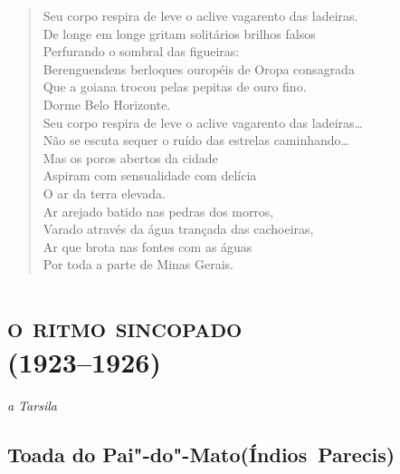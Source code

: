 \begin{verse}
Seu corpo respira de leve o aclive vagarento das ladeiras.\\
De longe em longe gritam solitários brilhos falsos\\
Perfurando o sombral das figueiras:\\
Berenguendens berloques ouropéis de Oropa consagrada\\
Que a goiana trocou pelas pepitas de ouro fino.\\
Dorme Belo Horizonte.\\
Seu corpo respira de leve o aclive vagarento das ladeiras\ldots{}\\
Não se escuta sequer o ruído das estrelas caminhando\ldots{}\\
Mas os poros abertos da cidade\\
Aspiram com sensualidade com delícia\\
O ar da terra elevada.\\
Ar arejado batido nas pedras dos morros,\\
Varado através da água trançada das cachoeiras,\\
Ar que brota nas fontes com as águas\\
Por toda a parte de Minas Gerais.
\end{verse}

\chapter[\textsc{o ritmo sincopado}\\Toada do Pai"-do"-Mato]{\textsc{o ritmo sincopado}\\(1923--1926)}


\begin{flushright}
\emph{a Tarsila}
\end{flushright}

\section*{Toada do Pai"-do"-Mato\break (Índios~Parecis)}


